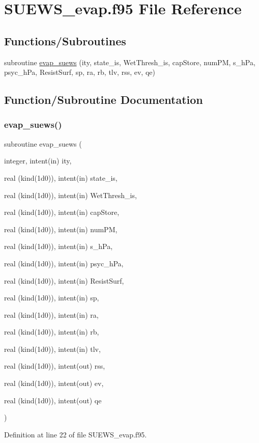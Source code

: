 \hypertarget{_s_u_e_w_s__evap_8f95}{}\section{S\+U\+E\+W\+S\+\_\+evap.\+f95 File Reference}
\label{_s_u_e_w_s__evap_8f95}
\subsection*{Functions/\+Subroutines}
\begin{DoxyCompactItemize}
\item 
subroutine \hyperlink{_s_u_e_w_s__evap_8f95_abb65abdb24905224cba51fe03f61809c}{evap\+\_\+suews} (ity, state\+\_\+is, Wet\+Thresh\+\_\+is, cap\+Store, num\+PM, s\+\_\+h\+Pa, psyc\+\_\+h\+Pa, Resist\+Surf, sp, ra, rb, tlv, rss, ev, qe)
\end{DoxyCompactItemize}


\subsection{Function/\+Subroutine Documentation}
\mbox{\label{_s_u_e_w_s__evap_8f95_abb65abdb24905224cba51fe03f61809c}} 
\subsubsection{\texorpdfstring{evap\+\_\+suews()}{evap\_suews()}}
{\footnotesize\ttfamily subroutine evap\+\_\+suews (\begin{DoxyParamCaption}\item[{integer, intent(in)}]{ity,  }\item[{real (kind(1d0)), intent(in)}]{state\+\_\+is,  }\item[{real (kind(1d0)), intent(in)}]{Wet\+Thresh\+\_\+is,  }\item[{real (kind(1d0)), intent(in)}]{cap\+Store,  }\item[{real (kind(1d0)), intent(in)}]{num\+PM,  }\item[{real (kind(1d0)), intent(in)}]{s\+\_\+h\+Pa,  }\item[{real (kind(1d0)), intent(in)}]{psyc\+\_\+h\+Pa,  }\item[{real (kind(1d0)), intent(in)}]{Resist\+Surf,  }\item[{real (kind(1d0)), intent(in)}]{sp,  }\item[{real (kind(1d0)), intent(in)}]{ra,  }\item[{real (kind(1d0)), intent(in)}]{rb,  }\item[{real (kind(1d0)), intent(in)}]{tlv,  }\item[{real (kind(1d0)), intent(out)}]{rss,  }\item[{real (kind(1d0)), intent(out)}]{ev,  }\item[{real (kind(1d0)), intent(out)}]{qe }\end{DoxyParamCaption})}



Definition at line 22 of file S\+U\+E\+W\+S\+\_\+evap.\+f95.

